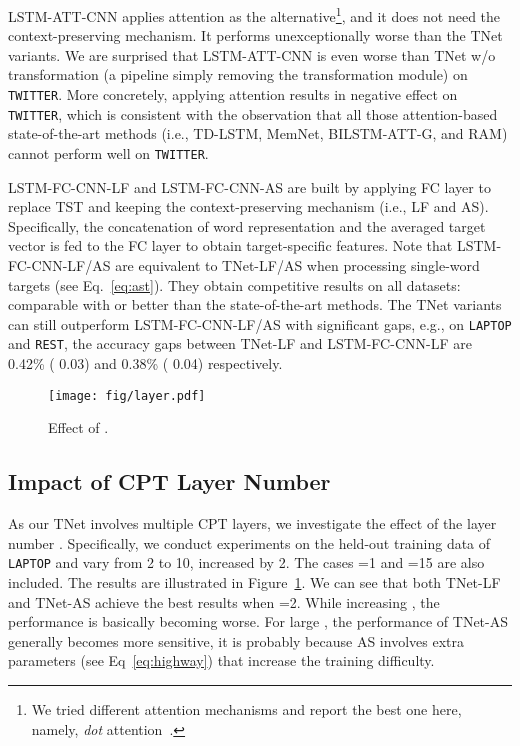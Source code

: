 \documentclass[11pt,a4paper]{article}
\begin{document}
LSTM-ATT-CNN applies attention as the alternative\footnote{We tried different attention mechanisms and report the best one here, namely, \textit{dot} attention~\cite{luong-pham-manning:2015:EMNLP}.}, and it does not need the context-preserving mechanism. It performs unexceptionally worse than the TNet variants. We are surprised that LSTM-ATT-CNN is even worse than TNet w/o transformation (a pipeline simply removing the transformation module) on \texttt{TWITTER}. More concretely, applying attention results in negative effect on \texttt{TWITTER}, which is consistent with the observation that all those attention-based state-of-the-art methods (i.e., TD-LSTM, MemNet, BILSTM-ATT-G, and RAM) cannot perform well on \texttt{TWITTER}. 

LSTM-FC-CNN-LF and LSTM-FC-CNN-AS are built by applying FC layer to replace TST and keeping the context-preserving mechanism (i.e., LF and AS). Specifically, the concatenation of word representation and the averaged target vector is fed to the FC layer to obtain target-specific features. Note that LSTM-FC-CNN-LF/AS are equivalent to TNet-LF/AS when processing single-word targets (see Eq.~\ref{eq:ast}).
They obtain competitive results on all datasets: comparable with or better than the state-of-the-art methods. The TNet variants can still outperform LSTM-FC-CNN-LF/AS with significant gaps, e.g., on \texttt{LAPTOP} and \texttt{REST}, the accuracy gaps between TNet-LF and LSTM-FC-CNN-LF are 0.42\% ( 0.03) and 0.38\% ( 0.04) respectively. 

\begin{figure}[!t]
    \centering
    \texttt{[image: fig/layer.pdf]}
\caption{Effect of .}
    \label{fig:layer}
\end{figure}

\subsection{Impact of CPT Layer Number}
As our TNet involves multiple CPT layers, we investigate the effect of the layer number . Specifically, we conduct experiments on the held-out training data of \texttt{LAPTOP} and vary  from 2 to 10, increased by 2. The cases =1 and =15 are also included. The results are illustrated in Figure~\ref{fig:layer}. We can see that both TNet-LF and TNet-AS achieve the best results when =2. While increasing , the performance is basically becoming worse. For large , the performance of TNet-AS generally becomes more sensitive, it is probably because AS involves extra parameters (see Eq~\ref{eq:highway}) that increase the training difficulty.  
\end{document}
